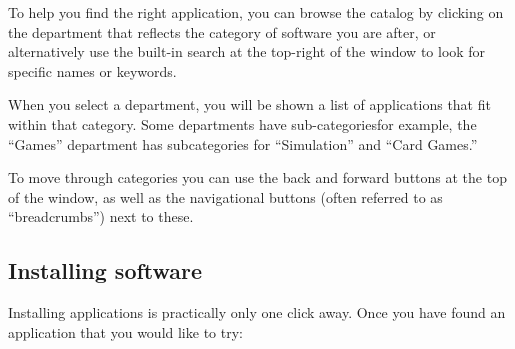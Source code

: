 To help you find the right application, you can browse the  catalog by clicking on the department that reflects the category of software you are after, or alternatively use the built-in search at the top-right of the window to look for specific names or keywords.

When you select a department, you will be shown a list of applications that fit within that category. Some departments have sub-categories\dash for example, the ``Games''
department has subcategories for ``Simulation'' and ``Card Games.''

To move through categories you can use the back and forward buttons at the top of the window, as well as the navigational buttons (often referred to as ``breadcrumbs'') next to these.

\subsection{Installing software}

Installing applications is practically only one click away. Once you have found an application that you would like to try:

